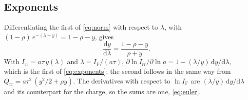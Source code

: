 \documentclass[10pt,a4paper]{scrartcl}
\newcommand{\IF}{I_\mathrm{F}}
\newcommand{\Irr}{I_\mathrm{rr}}
\newcommand{\Qrr}{Q_\mathrm{rr}}
\newcommand{\diff}{\mathrm{d}}
\begin{document}
\subsection{Exponents}
\label{app:exponents}
Differentiating the first of \eqref{eq:norm} with respect to $\lambda$, with $(1-\rho)\,e^{-(\lambda+y)} = 1-\rho-y$, gives
\begin{equation}
\frac{\diff y}{\diff\lambda} = \frac{1-\rho-y}{\rho+y} .
\end{equation}
With $\Irr = a\tau\,y(\lambda)$ and $\lambda = \IF/(a\tau)$, $\partial\ln\Irr/\partial\ln a = 1 - (\lambda/y)\,\diff y/\diff\lambda$, which is the first of \eqref{eq:exponents}; the second follows in the same way from $\Qrr = a\tau^2\,(y^2/2+\rho y)$. The derivatives with respect to $\ln\IF$ are $(\lambda/y)\,\diff y/\diff\lambda$ and its counterpart for the charge, so the sums are one, \eqref{eq:euler}.
\end{document}
